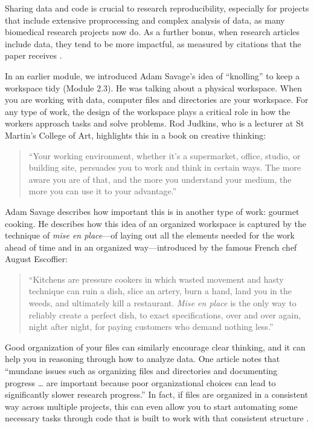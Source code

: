 \documentclass[]{tufte-book}
\begin{document}
Sharing data and code is crucial to research reproducibility, especially for
projects that include extensive proprocessing and complex analysis of data, as
many biomedical research projects now do. As a further bonus, when research articles
include data, they tend to be more impactful, as measured by
citations that the paper receives \citep{marwick2018packaging}.

In an earlier module, we introduced Adam Savage's idea of ``knolling'' to keep a
workspace tidy (Module 2.3). He was talking about a physical workspace. When
you are working with data, computer files and directories are your workspace.
For any type of work, the design of the workspace plays a critical role in
how the workers approach tasks and solve problems. Rod Judkins, who is a
lecturer at St Martin's College of Art, highlights this in a book on
creative thinking:

\begin{quote}
``Your working environment, whether it's a supermarket, office, studio, or
building site, persuades you to work and think in certain ways. The more aware
you are of that, and the more you understand your medium, the more you can use
it to your advantage.'' \citep{judkins2016art}
\end{quote}

Adam Savage describes how important this is in another type of work: gourmet
cooking. He describes how this idea of an organized workspace is captured by the
technique of \emph{mise en place}---of laying out all the elements needed for the
work ahead of time and in an organized way---introduced by the famous French
chef August Escoffier:

\begin{quote}
``Kitchens are pressure cookers in which wasted movement and hasty technique
can ruin a dish, slice an artery, burn a hand, land you in the weeds, and
ultimately kill a restaurant. \emph{Mise en place} is the only way to reliably create
a perfect dish, to exact specifications, over and over again, night after night,
for paying customers who demand nothing less.'' \citep{savage2020every}
\end{quote}

Good organization of your files can similarly encourage clear thinking, and it
can help you in reasoning through how to analyze data. One article notes that
``mundane issues such as organizing files and directories and documenting
progress \ldots{} are important because poor organizational choices can lead to
significantly slower research progress.'' \citep{noble2009quick} In fact, if files are
organized in a consistent way across multiple projects, this can even allow you
to start automating some necessary tasks through code that is built to work with
that consistent structure \citep{buffalo2015bioinformatics}.
\end{document}

